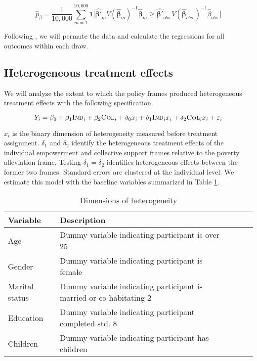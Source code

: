 \documentclass[11pt, a4paper]{article}\usepackage[]{graphicx}\usepackage[]{color}
\begin{document}
        \begin{equation} \label{eq:exactp}
            \hat{p}_{\beta} =  \frac{1}{10,000}\sum_{m=1}^{10,000} \mathbf{1} \Big [ \mathbf{\hat{\beta'}}_m V(\mathbf{\hat{\beta}}_m)^{-1} \mathbf{\hat{\beta}}_m \geq \mathbf{\hat{\beta'}}_{obs.} V(\mathbf{\hat{\beta}}_{obs.})^{-1} \hat{\beta}_{obs.} \Big ]
        \end{equation}

        Following \textcite{young_channeling_2015}, we will permute the data and calculate the regressions for all outcomes within each draw.

    \subsection{Heterogeneous treatment effects}

        We will analyze the extent to which the policy frames produced heterogeneous treatment effects with the following specification.

        \begin{equation}
            Y_{i} = \beta_{0} + \beta_{1}\text{\textsc{Ind}}_{i} + \beta_{2}\text{\textsc{Col}}_{i} + \delta_{0} x_i + \delta_{1}\text{\textsc{Ind}}_{i} x_i + \delta_{2}\text{\textsc{Col}}_{i} x_i + \varepsilon_{i}
        \label{eq:heteffect} \end{equation}

        $x_{i}$ is the binary dimension of heterogeneity measured before treatment assignment. $\delta_{1}$ and $\delta_{2}$ identify the heterogeneous treatment effects of the individual empowerment and collective support frames relative to the poverty alleviation frame. Testing $\delta_{1} = \delta_{2}$ identifies heterogeneous effects between the former two frames. Standard errors are clustered at the individual level. We estimate this model with the baseline variables summarized in Table \ref{tab:hetvars}.

        \begin{table}[h]
        \centering
        \caption{Dimensions of heterogeneity}
        \label{tab:hetvars}
        \begin{tabular}{@{}lllll@{}}
        \toprule
        Variable                                     & Description                                          &  &  &  \\ \midrule
        Age & Dummy variable indicating participant is over 25 &  &  &  \\
        Gender & Dummy variable indicating participant is female &  &  &  \\
        Marital status & Dummy variable indicating participant is married or co-habitating 2 &  &  &  \\
        Education & Dummy variable indicating participant completed std. 8 &  &  &  \\
        Children & Dummy variable indicating participant has children &  &  &  \\
        \bottomrule
        \end{tabular}
        \end{table}
\end{document}
